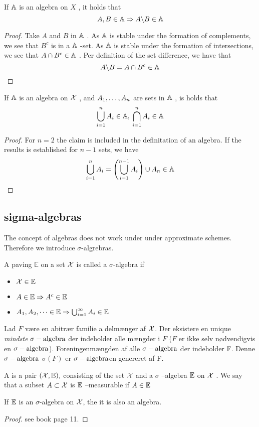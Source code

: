 \begin{lem}
If \({\mathbb{A}}\)  is an algebra on \(X\) , it holds that
\[
  A,B\in{\mathbb{A}}\Rightarrow A\backslash B\in{\mathbb{A}}
\]
\end{lem}

\begin{proof}
Take \(A\)  and \(B\)  in \({\mathbb{A}}\) . As \({\mathbb{A}}\)  is stable under the formation of complements, we see that \(B^{c}\)  is in a \({\mathbb{A}}\) -set. As \({\mathbb{A}}\)  is stable under the formation of intersections, we see that \(A\cap B^{c}\in{\mathbb{A}}\) . Per definition of the set difference, we have that
\[
A\backslash B=A\cap B^{c}\in{\mathbb{A}}
\]
\end{proof}

\begin{lem}
If \({\mathbb{A}}\)  is an algebra on \({\mathcal{X}}\) , and \(A_1,\ldots,A_n\)  are sets in \({\mathbb{A}}\) , is holds that
\[
\bigcup_{i=1}^{n}A_{i}\in{\mathbb{A}},\:\bigcap_{i=1}^{n}A_{i}\in{\mathbb{A}}
\]
\end{lem}
\begin{proof}
For \(n=2\)  the claim is included in the definitation of an algebra. If the results is established for \(n-1\)  sets, we have
\[
\bigcup_{i=1}^{n}A_{i}=\left(\bigcup_{i=1}^{n-1}A_{i}\right)\cup A_{n}\in{\mathbb{A}}
\]
\end{proof}

\subsection{{sigma-algebras}}
The concept of algebras does not work under under approximate schemes. Therefore we introduce \(\sigma\)-algrebras.

\begin{defn}
A paving \(\mathbb{E}\)  on a set \({\mathcal{X}}\)  is called a \(\sigma\)-algebra if
\begin{itemize}
  \item \({\mathcal{X}}\in{\mathbb{E}}\)
  \item \(A\in{\mathbb{E}}\Rightarrow A^{c}\in{\mathbb{E}}\)
  \item \(A_{1},A_{2},\dots\in{\mathbb{E}}\Rightarrow\bigcup_{i=1}^{\infty}A_{i}\in{\mathbb{E}}\)
\end{itemize}

\begin{defn}
Lad \(F\) være en abitrær familie a delmænger af \({\mathcal{X}}\). Der eksistere en unique \emph{mindste} \(\sigma-\text{algebra}\) der indeholder alle mængder i \(F\) (\(F\) er ikke selv nødvendigvis en \(\sigma-\text{algebra}\)). Foreningenmængden af alle \(\sigma-\text{algebra}\) der indeholder F. Denne \(\sigma-\text{algebra}\) \(\sigma(F)\) er \(\sigma-\text{algebra}\)en genereret af F.
\end{defn}
A   is a pair \(({\mathcal{X}},{\mathbb{E}}),\)  consisting
of the set \({\mathcal{X}}\)  and a \(\sigma\) --algebra \({\mathbb{E}}\)  on \({\mathcal{X}}\) . We say that
a subset \(A\subset {\mathcal{X}}\)  is \({\mathbb{E}}\) --measurable if \(A\in{\mathbb{E}}\)
\end{defn}
\begin{lem}
If \({\mathbb{E}}\)  is an \(\sigma\)-algebra on \({\mathcal{X}}\), the it is also an algebra.
\end{lem}
\begin{proof}
see book page 11.
\end{proof}
